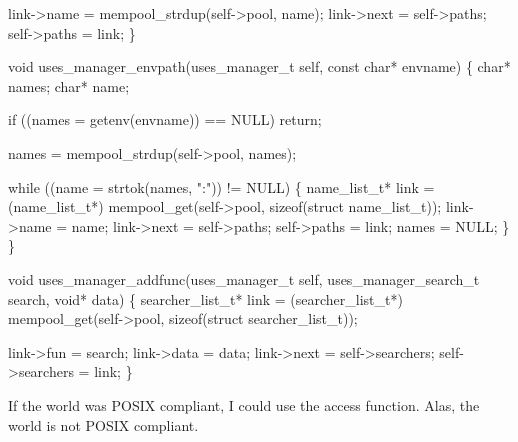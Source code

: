     link->name = mempool_strdup(self->pool, name);
    link->next = self->paths;
    self->paths = link;
\}

\nwendcode{}\nwdocspar

\nwenddocs{}\plusendmoddef\nwstartdeflinemarkup{}\nwenddeflinemarkup
void uses_manager_envpath(uses_manager_t self, const char* envname)
\{
    char* names;
    char* name;

    if ((names = getenv(envname)) == NULL)
        return;

    names = mempool_strdup(self->pool, names);

    while ((name = strtok(names, ":")) != NULL) \{
        name_list_t* link = (name_list_t*)
            mempool_get(self->pool, sizeof(struct name_list_t));
        link->name = name;
        link->next = self->paths;
        self->paths = link;
        names = NULL;
    \}
\}

\nwendcode{}\nwdocspar

\nwenddocs{}\plusendmoddef\nwstartdeflinemarkup{}\nwenddeflinemarkup
void uses_manager_addfunc(uses_manager_t self, 
                                  uses_manager_search_t search,
                                  void* data)
\{
    searcher_list_t* link = (searcher_list_t*)
        mempool_get(self->pool, sizeof(struct searcher_list_t));

    link->fun = search;
    link->data = data;
    link->next = self->searchers;
    self->searchers = link;
\}

\nwendcode{}\nwdocspar


If the world was POSIX compliant, I could use the {\Tt{}access\nwendquote} function.
Alas, the world is not POSIX compliant.

